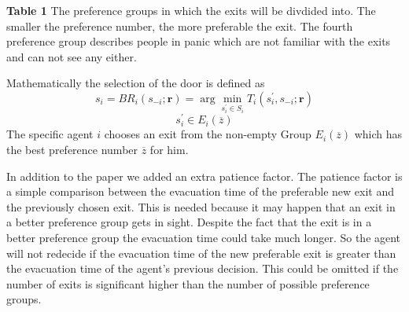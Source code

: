 \textbf{Table 1} The preference groups in which the exits will be divdided
into. The smaller the preference number, the more preferable the exit. The
fourth preference group describes people in panic which are not familiar with
the exits and can not see any either. \cite{BestResponseDynamics}

Mathematically the selection of the door is defined as
\[s_i = BR_i(s_{-i};\mathbf{r}) = \arg \underset{s^{\prime}_i \in S_i}{\min} T_i(s^{\prime}_i,s_{-i};\mathbf{r})\]
\[s^{\prime}_i \in E_i(\overline{z})\]
The specific agent $i$ chooses an exit from the non-empty Group
$E_i(\overline{z})$ which has the best preference number $\overline{z}$ for
him. 

In addition to the paper we added an extra patience factor. The patience
factor is a simple comparison between the evacuation time of the preferable
new exit and the previously chosen exit. This is needed because it may happen
that an exit in a better preference group gets in sight. Despite the fact that
the exit is in a better preference group the evacuation time could take much
longer. So the agent will not redecide if the evacuation time of the new
preferable exit is greater than the evacuation time of the agent's previous
decision. This could be omitted if the number of exits is significant higher
than the number of possible preference groups.




